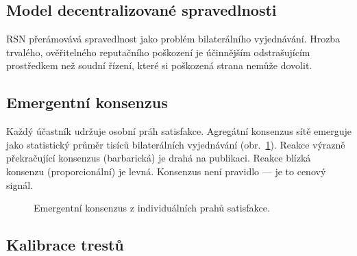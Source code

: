 \documentclass[11pt,a4paper,twocolumn]{article}
\begin{document}
\subsection{Model decentralizované spravedlnosti}

RSN přerámovává spravedlnost jako problém bilaterálního vyjednávání. Hrozba trvalého, ověřitelného reputačního poškození je účinnějším odstrašujícím prostředkem než soudní řízení, které si poškozená strana nemůže dovolit.

\subsection{Emergentní konsenzus}

Každý účastník udržuje osobní práh satisfakce. Agregátní konsenzus sítě emerguje jako statistický průměr tisíců bilaterálních vyjednávání (obr.~\ref{fig:consensus}). Reakce výrazně překračující konsenzus (barbarická) je drahá na publikaci. Reakce blízká konsenzu (proporcionální) je levná. Konsenzus není pravidlo --- je to cenový signál.

\begin{figure}[ht]
\centering
{}
\caption{Emergentní konsenzus z individuálních prahů satisfakce.}
\label{fig:consensus}
\end{figure}

\subsection{Kalibrace trestů}
\end{document}
